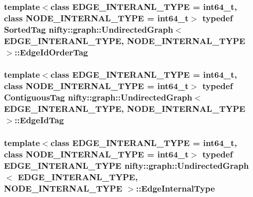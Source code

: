 \subsubsection[{Edge\+Id\+Order\+Tag}]{\setlength{\rightskip}{0pt plus 5cm}template$<$class E\+D\+G\+E\+\_\+\+I\+N\+T\+E\+R\+A\+N\+L\+\_\+\+T\+Y\+P\+E = int64\+\_\+t, class N\+O\+D\+E\+\_\+\+I\+N\+T\+E\+R\+N\+A\+L\+\_\+\+T\+Y\+P\+E = int64\+\_\+t$>$ typedef {\bf Sorted\+Tag} {\bf nifty\+::graph\+::\+Undirected\+Graph}$<$ E\+D\+G\+E\+\_\+\+I\+N\+T\+E\+R\+A\+N\+L\+\_\+\+T\+Y\+P\+E, N\+O\+D\+E\+\_\+\+I\+N\+T\+E\+R\+N\+A\+L\+\_\+\+T\+Y\+P\+E $>$\+::{\bf Edge\+Id\+Order\+Tag}}\label{classnifty_1_1graph_1_1UndirectedGraph_a2f74e8de961bf80dc037ceedf58c46a4}
\hypertarget{classnifty_1_1graph_1_1UndirectedGraph_a5e5a59e9d25ab322da5e8286cadc3e00}{}
\subsubsection[{Edge\+Id\+Tag}]{\setlength{\rightskip}{0pt plus 5cm}template$<$class E\+D\+G\+E\+\_\+\+I\+N\+T\+E\+R\+A\+N\+L\+\_\+\+T\+Y\+P\+E = int64\+\_\+t, class N\+O\+D\+E\+\_\+\+I\+N\+T\+E\+R\+N\+A\+L\+\_\+\+T\+Y\+P\+E = int64\+\_\+t$>$ typedef {\bf Contiguous\+Tag} {\bf nifty\+::graph\+::\+Undirected\+Graph}$<$ E\+D\+G\+E\+\_\+\+I\+N\+T\+E\+R\+A\+N\+L\+\_\+\+T\+Y\+P\+E, N\+O\+D\+E\+\_\+\+I\+N\+T\+E\+R\+N\+A\+L\+\_\+\+T\+Y\+P\+E $>$\+::{\bf Edge\+Id\+Tag}}\label{classnifty_1_1graph_1_1UndirectedGraph_a5e5a59e9d25ab322da5e8286cadc3e00}
\hypertarget{classnifty_1_1graph_1_1UndirectedGraph_a70e38582c25deca5e0ce080277cb30fc}{}
\subsubsection[{Edge\+Internal\+Type}]{\setlength{\rightskip}{0pt plus 5cm}template$<$class E\+D\+G\+E\+\_\+\+I\+N\+T\+E\+R\+A\+N\+L\+\_\+\+T\+Y\+P\+E = int64\+\_\+t, class N\+O\+D\+E\+\_\+\+I\+N\+T\+E\+R\+N\+A\+L\+\_\+\+T\+Y\+P\+E = int64\+\_\+t$>$ typedef E\+D\+G\+E\+\_\+\+I\+N\+T\+E\+R\+A\+N\+L\+\_\+\+T\+Y\+P\+E {\bf nifty\+::graph\+::\+Undirected\+Graph}$<$ E\+D\+G\+E\+\_\+\+I\+N\+T\+E\+R\+A\+N\+L\+\_\+\+T\+Y\+P\+E, N\+O\+D\+E\+\_\+\+I\+N\+T\+E\+R\+N\+A\+L\+\_\+\+T\+Y\+P\+E $>$\+::{\bf Edge\+Internal\+Type}\hspace{0.3cm}{\ttfamily [protected]}}\label{classnifty_1_1graph_1_1UndirectedGraph_a70e38582c25deca5e0ce080277cb30fc}
\hypertarget{classnifty_1_1graph_1_1UndirectedGraph_aa37a0dc690ad1257d5eb5105e7d66bba}{}
